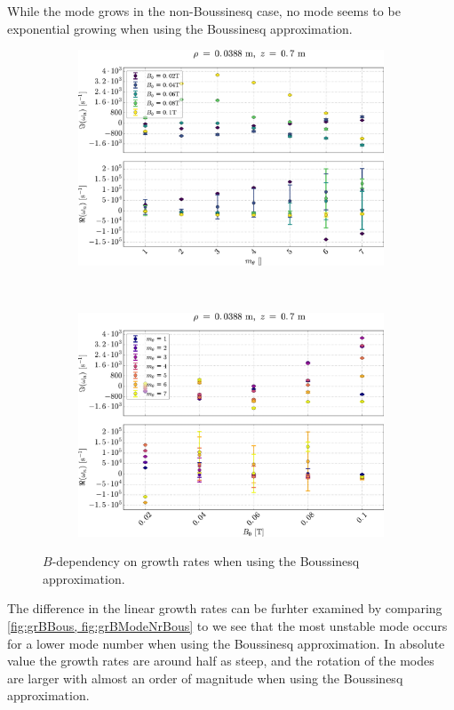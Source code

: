 %
While the  mode grows in the non-Boussinesq case, no mode seems to be exponential growing when using the Boussinesq approximation.
%
\begin{figure}[htbp]
    \centering
    \begin{subfigure}[h]{1.00\textwidth}
        \centering
        \includegraphics[width=1.0\textwidth]{fig/results/compareBouss/growthRatesB0Bous}
        \label{fig:grBBous}
    \end{subfigure}%
    \\
    \begin{subfigure}[h]{1.00\textwidth}
        \centering
        \includegraphics[width=1.0\textwidth]{fig/results/compareBouss/growthRatesB0ModeNr}
        \label{fig:grBModeNrBous}
    \end{subfigure}
    \caption{$B$-dependency on growth rates when using the Boussinesq approximation.}
\end{figure}
%
The difference in the linear growth rates can be furhter examined by comparing \cref{fig:grBBous, fig:grBModeNrBous} to
we see that the most unstable mode occurs for a lower mode number when using the Boussinesq approximation.
In absolute value the growth rates are around half as steep, and the rotation of the modes are larger with almost an order of magnitude when using the Boussinesq approximation.



